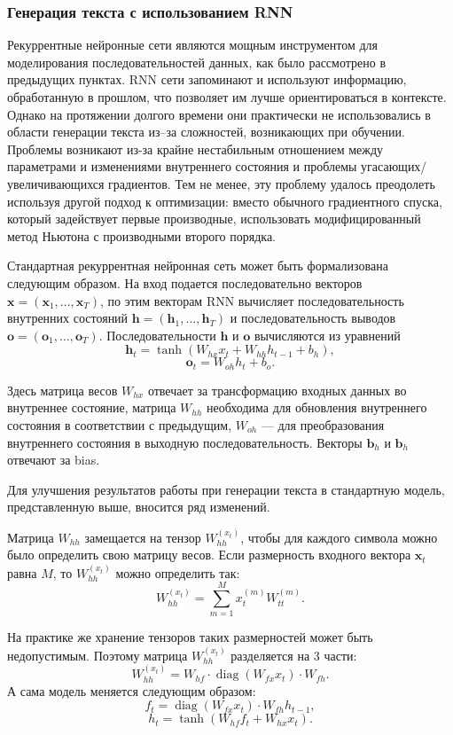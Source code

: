 \subsubsection{Генерация текста с использованием RNN}
Рекуррентные нейронные сети являются мощным инструментом для моделирования последовательностей данных, как было рассмотрено в предыдущих пунктах. RNN сети запоминают и используют информацию, обработанную в прошлом, что позволяет им лучше ориентироваться в контексте. Однако на протяжении долгого времени они практически не использовались в области генерации текста из--за сложностей, возникающих при обучении. Проблемы возникают из-за крайне нестабильным отношением между параметрами и изменениями внутреннего состояния и проблемы угасающих/увеличивающихся градиентов\cite{bengio1994learning}. Тем не менее, эту проблему удалось преодолеть используя другой подход к оптимизации: вместо обычного градиентного спуска, который задействует первые производные, использовать модифицированный метод Ньютона с производными второго порядка\cite{martens2010deep}.

Стандартная рекуррентная нейронная сеть может быть формализована следующим образом. На вход подается последовательно векторов $\mathbf{x} = (\mathbf{x}_1, \dots, \mathbf{x}_T)$, по этим векторам RNN вычисляет последовательность внутренних состояний $\mathbf{h} = (\mathbf{h}_1, \dots, \mathbf{h}_T)$ и последовательность выводов $\mathbf{o} = (\mathbf{o}_1, \dots, \mathbf{o}_T)$. Последовательности $\mathbf{h}$ и $\mathbf{o}$ вычисляются из уравнений
$$\mathbf{h}_t = \tanh(W_{hx}x_t + W_{hh}h_{t - 1} + b_h),$$
$$\mathbf{o}_t = W_{oh}h_t + b_o.$$

Здесь матрица весов $W_{hx}$ отвечает за трансформацию входных данных во внутреннее состояние, матрица $W_{hh}$ необходима для обновления внутреннего состояния в соответствии с предыдущим, $W_{oh}$ --- для преобразования внутреннего состояния в выходную последовательность. Векторы $\mathbf{b}_h$ и $\mathbf{b}_h$ отвечают за bias.

Для улучшения результатов работы при генерации текста в стандартную модель, представленную выше, вносится ряд изменений.

Матрица $W_{hh}$ замещается на тензор $W_{hh}^{(x_t)}$, чтобы для каждого символа можно было определить свою матрицу весов. Если размерность входного вектора $\mathbf{x}_t$ равна $M$, то $W_{hh}^{(x_t)}$ можно определить так:
$$W_{hh}^{(x_t)} = \sum_{m = 1}^{M} x_t^{(m)}W_{tt}^{(m)}.$$

На практике же хранение тензоров таких размерностей может быть недопустимым. Поэтому матрица $W_{hh}^{(x_t)}$ разделяется на 3 части:
$$W_{hh}^{(x_t)} = W_{hf} \cdot \operatorname{diag}(W_{fx}x_t) \cdot W_{fh}.$$
А сама модель меняется следующим образом:
$$f_t = \operatorname{diag}(W_{fx}x_t) \cdot W_{fh} h_{t - 1},$$
$$h_t = \tanh(W_{hf}f_t + W_{hx}x_t).$$

